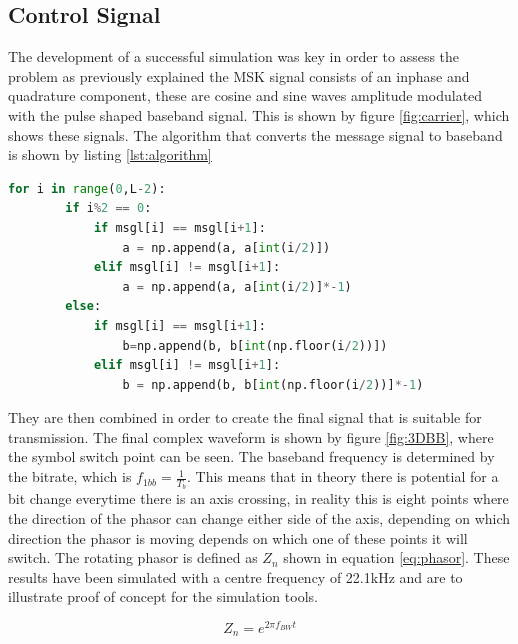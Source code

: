 \subsection{Control Signal}
The development of a successful simulation was key in order to assess the problem as previously explained the MSK signal consists of an inphase and quadrature component, these are cosine and sine waves amplitude modulated with the pulse shaped baseband signal. This is shown by figure \ref{fig:carrier}, which shows these signals. The algorithm that converts the message signal to baseband is shown by listing \ref{lst:algorithm}
\begin{lstlisting}[language = python, captionpos=b, caption = Algorithm to create Correct signs for $a_{i}$ and $a_{q}$, label = lst:algorithm]
    for i in range(0,L-2):
        if i%2 == 0:
            if msgl[i] == msgl[i+1]:
                a = np.append(a, a[int(i/2)])
            elif msgl[i] != msgl[i+1]:
                a = np.append(a, a[int(i/2)]*-1)
        else:
            if msgl[i] == msgl[i+1]:
                b=np.append(b, b[int(np.floor(i/2))])
            elif msgl[i] != msgl[i+1]:
                b = np.append(b, b[int(np.floor(i/2))]*-1)
\end{lstlisting}
They are then combined in order to create the final signal that is suitable for transmission. The final complex waveform is shown by figure \ref{fig:3DBB}, where the symbol switch point can be seen. The baseband frequency is determined by the bitrate, which is $f_{1bb} = \frac{1}{T_b}$. This means that in theory there is potential for a bit change everytime there is an axis crossing, in reality this is eight points where the direction of the phasor can change either side of the axis, depending on which direction the phasor is moving depends on which one of these points it will switch. The rotating phasor is defined as $Z_{n}$ shown in equation \ref{eq:phasor}. These results have been simulated with a centre frequency of 22.1kHz and are to illustrate proof of concept for the simulation tools.

\begin{equation}
    Z_n = e^{2\pi f_{BW}t}
    \label{eq:phasor}
\end{equation}


